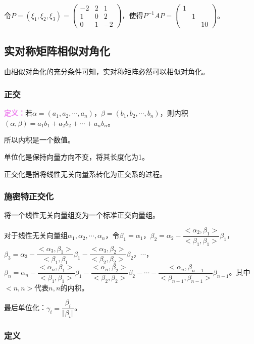 \documentclass[UTF8, 12pt]{ctexart}
\begin{document}
令$P=(\xi_1,\xi_2,\xi_3)=\left(\begin{array}{ccc}
-2 & 2 & 1 \\
1 & 0 & 2 \\
0 & 1 & -2
\end{array}\right)$，使得$P^{-1}AP=\left(\begin{array}{ccc}
1 \\
& 1 \\
& & 10
\end{array}\right)$。

\subsection{实对称矩阵相似对角化}

由相似对角化的充分条件可知，实对称矩阵必然可以相似对角化。

\subsubsection{正交}

\textcolor{violet}{\textbf{定义：}}若$\alpha=(a_1,a_2,\cdots,a_n)$，$\beta=(b_1,b_2,\cdots,b_n)$，则内积$(\alpha,\beta)=a_1b_1+a_2b_2+\cdots+a_nb_n$。

所以内积是一个数值。

单位化是保持向量方向不变，将其长度化为1。

正交化是指将线性无关向量系转化为正交系的过程。

\subsubsection{施密特正交化}

将一个线性无关向量组变为一个标准正交向量组。

对于线性无关向量组$\alpha_1,\alpha_2,\cdots,\alpha_n$，令$\beta_1=\alpha_1$，$\beta_2=\alpha_2-\dfrac{<\alpha_2,\beta_1>}{<\beta_1,\beta_1>}\beta_1$，$\beta_3=\alpha_3-\dfrac{<\alpha_3,\beta_1>}{<\beta_1,\beta_1}\beta_1-\dfrac{<\alpha_3,\beta_2>}{<\beta_2,\beta_2>}\beta_2$，$\cdots$，$\beta_n=\alpha_n-\dfrac{<\alpha_n,\beta_1>}{<\beta_1,\beta_1>}\beta_1-\dfrac{<\alpha_n,\beta_2>}{<\beta_2,\beta_2>}\beta_2-\cdots-\dfrac{<\alpha_n,\beta_{n-1}}{<\beta_{n-1},\beta_{n-1}>}\beta_{n-1}$。其中$<n,n>$代表$n,n$的内积。

最后单位化：$\gamma_i=\dfrac{\beta_i}{\Vert\beta_i\Vert}$。

\subsubsection{定义}
\end{document}
